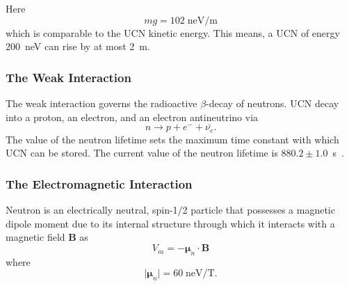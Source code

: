 Here
\begin{equation}
mg=102\; \text{neV/m}
\end{equation}
which is comparable to the UCN kinetic energy. This means, a UCN of
energy 200~neV can rise by at most 2~m.
\subsubsection{The Weak Interaction}
The weak interaction governs the radioactive $\beta$-decay of
neutrons. UCN decay into a proton, an electron, and an electron
antineutrino via
\label{neutrondecay}
\begin{equation}
n\longrightarrow p+e^{-}+\bar{\nu_{e}}.
\end{equation}
The value of the neutron lifetime sets the maximum time constant with
which UCN can be stored. The current value of the neutron lifetime is
$880.2 \pm 1.0$~s~\citep{PDG2018}.

\subsubsection{The Electromagnetic Interaction}

Neutron is an electrically neutral, spin-1/2 particle that possesses a
magnetic dipole moment due to its internal structure through which it
interacts with a magnetic field \textbf{B} as
\begin{equation}
  \label{eqn:vmag}
V_m=-\boldsymbol{\mu}_n \cdot \textbf{B}
\end{equation}
where
\begin{equation}
\vert \boldsymbol{\mu}_n \vert =60 \; \text{neV/T}.
\end{equation}

